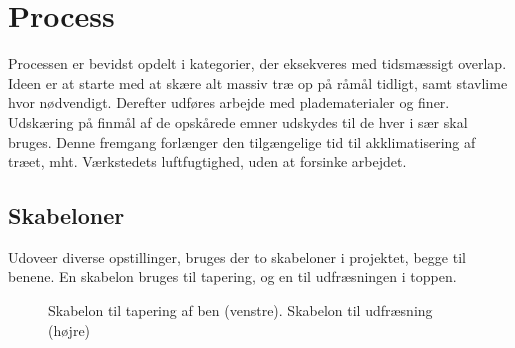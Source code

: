 \section*{Process}
Processen er bevidst opdelt i kategorier, der eksekveres med tidsmæssigt
overlap. Ideen er at starte med at skære alt massiv træ op på råmål tidligt,
samt stavlime hvor nødvendigt. Derefter udføres arbejde med pladematerialer og
finer. Udskæring på finmål af de opskårede emner udskydes til de hver i sær skal
bruges. Denne fremgang forlænger den tilgængelige tid til akklimatisering af
træet, mht. Værkstedets luftfugtighed, uden at forsinke arbejdet.

\subsection*{Skabeloner}
Udoveer diverse opstillinger, bruges der to skabeloner i projektet, begge til
benene. En skabelon bruges til tapering, og en til udfræsningen i toppen.

\begin{figure}[htb]
\centering
{}
\caption{Skabelon til tapering af ben (venstre). Skabelon til udfræsning (højre)}
\end{figure}

